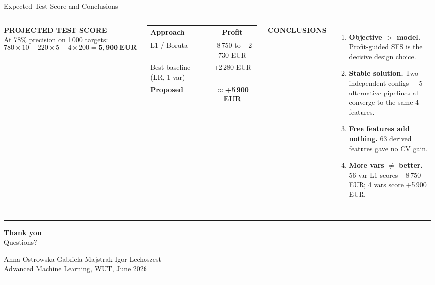 \documentclass[aspectratio=169,10pt]{beamer}
\newcommand{\slabel}[1]{\textbf{\tiny\MakeUppercase{#1}}\\[0.25em]}
\begin{document}
\begin{frame}{Expected Test Score and Conclusions}
\begin{columns}[T]

\slabel{Projected test score}
At 78\% precision on 1\,000 targets:
\[
  780{\times}10 - 220{\times}5 - 4{\times}200 = \mathbf{5{,}900~\text{EUR}}
\]

\vspace{0.2em}
\footnotesize
\begin{tabular}{@{}lc@{}}
\toprule
Approach & Profit \\
\midrule
L1 / Boruta & $-$8\,750 to $-$2\,730 EUR \\
Best baseline (LR, 1 var) & +2\,280 EUR \\
\textbf{Proposed} & \textbf{$\approx$+5\,900 EUR} \\
\bottomrule
\end{tabular}


\slabel{Conclusions}
\begin{enumerate}\itemsep3pt\small
  \item \textbf{Objective $>$ model.} Profit-guided SFS is the decisive design choice.
  \item \textbf{Stable solution.} Two independent configs + 5 alternative pipelines all converge to the same 4 features.
  \item \textbf{Free features add nothing.} 63 derived features gave no CV gain.
  \item \textbf{More vars $\neq$ better.} 56-var L1 scores $-$8\,750 EUR; 4 vars score $+$5\,900 EUR.
\end{enumerate}

\end{columns}
\end{frame}

\begin{frame}[plain]
\centering\vfill
\textcolor{mid}{\rule{0.08\textwidth}{0.3pt}}\par
\vspace{0.7em}
{\Large\bfseries Thank you}\\[0.5em]
{\small\textcolor{mid}{Questions?}}\par
\vspace{1.0em}
{\footnotesize Anna Ostrowska \textperiodcentered{} Gabriela Majstrak \textperiodcentered{} Igor Lechoszest}\\[0.25em]
{\footnotesize\textcolor{mid}{Advanced Machine Learning, WUT, June 2026}}
\vfill
\textcolor{mid}{\rule{0.08\textwidth}{0.3pt}}
\end{frame}
\end{document}
